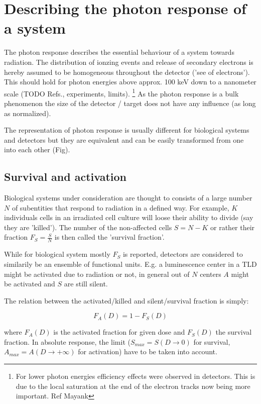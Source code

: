 \chapter{Describing the photon response of a system}

The photon response describes the essential behaviour of a system towards
radiation. The distribution of ionzing events and release of secondary electrons
is hereby assumed to be homogeneous throughout the detector ('see of
electrons'). This should hold for photon energies above approx. 100 keV down
to a nanometer scale (TODO Refs., experiments, limits). \footnote{For lower
photon energies efficiency effects were observed in detectors. This is due to
the local saturation at the end of the electron tracks now being more
important. Ref Mayank} As the photon response is a bulk phenomenon the size of
the detector / target does not have any influence (as long as normalized).

The representation of photon response is usually different for biological
systems and detectors but they are equivalent and can be easily transformed from
one into each other (Fig).

\section{Survival and activation}
Biological systems under consideration are thought to consists of a large
number $N$ of subentities that respond to radiation in a defined way. For
example, $K$ individuals cells in an irradiated cell culture will loose their
ability to divide (say they are 'killed'). The number of the non-affected cells
$S = N-K$ or rather their fraction $F_S = \frac{S}{N}$ is then called the
'survival fraction'.

While for biological system mostly $F_S$ is reported, detectors
are considered to similarily be an ensemble of functional units. E.g. a
luminescence center in a TLD might be activated due to radiation or not, in
general out of $N$ centers $A$ might be activated and $S$ are still silent.

The relation between the activated/killed and silent/survival fraction is
simply:

\begin{equation}
   F_A(D) = 1 - F_S(D)
\end{equation}

where $F_A(D)$ is the activated fraction for given dose and $F_S(D)$ the
survival fraction. In absolute response, the limit ($S_{max} = S(D\rightarrow
0)$ for survival, $A_{max} = A(D\rightarrow +\infty)$ for activation) have to be
taken into account.

